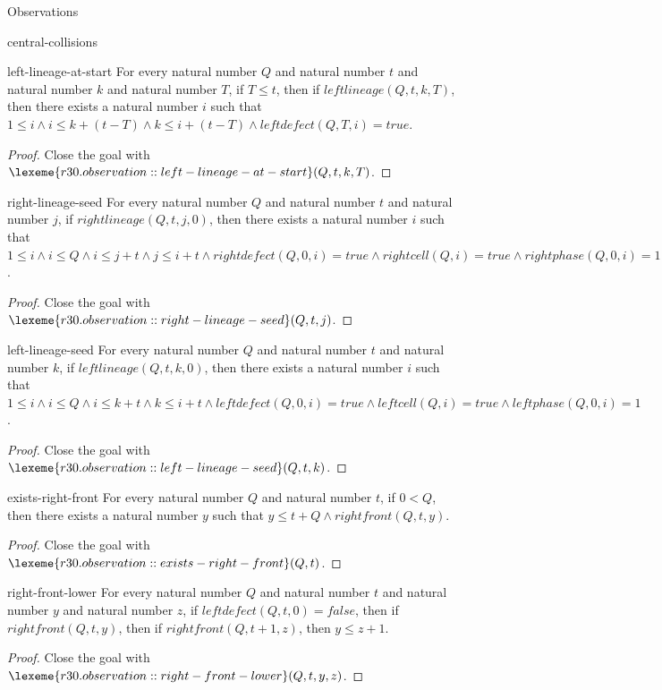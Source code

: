 \begin{lexlean}{Observations}
\begin{section}{central-collisions}
\begin{theorem}{left-lineage-at-start}
For every natural number \(Q\) and natural number \(t\) and natural number \(k\) and natural number \(T\), if \(T ≤ t\), then if \(leftlineage(Q, t, k, T)\), then there exists a natural number \(i\) such that \(1 ≤ i ∧ i ≤ k + (t - T) ∧ k ≤ i + (t - T) ∧ leftdefect(Q, T, i) = true\).
\begin{proof}
Close the goal with \(\lexeme{r30.observation::left-lineage-at-start}(Q, t, k, T)\).
\end{proof}
\end{theorem}

\begin{theorem}{right-lineage-seed}
For every natural number \(Q\) and natural number \(t\) and natural number \(j\), if \(rightlineage(Q, t, j, 0)\), then there exists a natural number \(i\) such that \(1 ≤ i ∧ i ≤ Q ∧ i ≤ j + t ∧ j ≤ i + t ∧ rightdefect(Q, 0, i) = true ∧ rightcell(Q, i) = true ∧ rightphase(Q, 0, i) = 1\).
\begin{proof}
Close the goal with \(\lexeme{r30.observation::right-lineage-seed}(Q, t, j)\).
\end{proof}
\end{theorem}

\begin{theorem}{left-lineage-seed}
For every natural number \(Q\) and natural number \(t\) and natural number \(k\), if \(leftlineage(Q, t, k, 0)\), then there exists a natural number \(i\) such that \(1 ≤ i ∧ i ≤ Q ∧ i ≤ k + t ∧ k ≤ i + t ∧ leftdefect(Q, 0, i) = true ∧ leftcell(Q, i) = true ∧ leftphase(Q, 0, i) = 1\).
\begin{proof}
Close the goal with \(\lexeme{r30.observation::left-lineage-seed}(Q, t, k)\).
\end{proof}
\end{theorem}

\begin{theorem}{exists-right-front}
For every natural number \(Q\) and natural number \(t\), if \(0 < Q\), then there exists a natural number \(y\) such that \(y ≤ t + Q ∧ rightfront(Q, t, y)\).
\begin{proof}
Close the goal with \(\lexeme{r30.observation::exists-right-front}(Q, t)\).
\end{proof}
\end{theorem}

\begin{theorem}{right-front-lower}
For every natural number \(Q\) and natural number \(t\) and natural number \(y\) and natural number \(z\), if \(leftdefect(Q, t, 0) = false\), then if \(rightfront(Q, t, y)\), then if \(rightfront(Q, t + 1, z)\), then \(y ≤ z + 1\).
\begin{proof}
Close the goal with \(\lexeme{r30.observation::right-front-lower}(Q, t, y, z)\).
\end{proof}
\end{theorem}


\end{section}
\end{lexlean}
